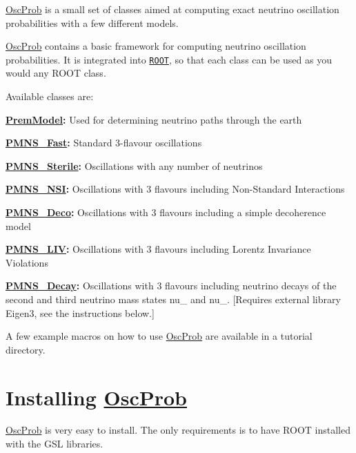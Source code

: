 \hyperlink{namespaceOscProb}{Osc\+Prob} is a small set of classes aimed at computing exact neutrino oscillation probabilities with a few different models.

\hyperlink{namespaceOscProb}{Osc\+Prob} contains a basic framework for computing neutrino oscillation probabilities. It is integrated into \href{https://root.cern.ch/}{\tt R\+O\+OT}, so that each class can be used as you would any R\+O\+OT class.

Available classes are\+:
\begin{DoxyItemize}
\item {\bfseries \hyperlink{classOscProb_1_1PremModel}{Prem\+Model}\+:} Used for determining neutrino paths through the earth
\item {\bfseries \hyperlink{classOscProb_1_1PMNS__Fast}{P\+M\+N\+S\+\_\+\+Fast}\+:} Standard 3-\/flavour oscillations
\item {\bfseries \hyperlink{classOscProb_1_1PMNS__Sterile}{P\+M\+N\+S\+\_\+\+Sterile}\+:} Oscillations with any number of neutrinos
\item {\bfseries \hyperlink{classOscProb_1_1PMNS__NSI}{P\+M\+N\+S\+\_\+\+N\+SI}\+:} Oscillations with 3 flavours including Non-\/\+Standard Interactions
\item {\bfseries \hyperlink{classOscProb_1_1PMNS__Deco}{P\+M\+N\+S\+\_\+\+Deco}\+:} Oscillations with 3 flavours including a simple decoherence model
\item {\bfseries \hyperlink{classOscProb_1_1PMNS__LIV}{P\+M\+N\+S\+\_\+\+L\+IV}\+:} Oscillations with 3 flavours including Lorentz Invariance Violations
\item {\bfseries \hyperlink{classOscProb_1_1PMNS__Decay}{P\+M\+N\+S\+\_\+\+Decay}\+:} Oscillations with 3 flavours including neutrino decays of the second and third neutrino mass states nu\+\_ and nu\+\_. \mbox{[}Requires external library Eigen3, see the instructions below.\mbox{]}
\end{DoxyItemize}

A few example macros on how to use \hyperlink{namespaceOscProb}{Osc\+Prob} are available in a tutorial directory.

\section*{Installing \hyperlink{namespaceOscProb}{Osc\+Prob}}

\hyperlink{namespaceOscProb}{Osc\+Prob} is very easy to install. The only requirements is to have R\+O\+OT installed with the G\+SL libraries.

